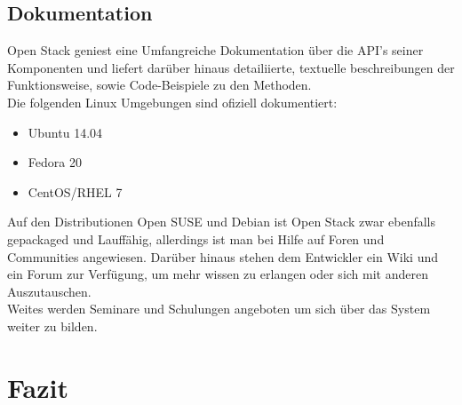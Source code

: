 \documentclass[a4paper,nochapterprefix,ngerman,12pt]{scrreprt}
\begin{document}
\section{Dokumentation}
Open Stack geniest eine Umfangreiche Dokumentation über die API's seiner Komponenten und liefert darüber hinaus detailiierte, textuelle beschreibungen der Funktionsweise, sowie Code-Beispiele zu den Methoden.\\
Die folgenden Linux Umgebungen sind ofiziell dokumentiert:
\begin{itemize}
	\item Ubuntu 14.04
	\item Fedora 20
	\item CentOS/RHEL 7
\end{itemize}
Auf den Distributionen Open SUSE und Debian ist Open Stack zwar ebenfalls gepackaged und Lauffähig, allerdings ist man bei Hilfe auf Foren und Communities angewiesen.
Darüber hinaus stehen dem Entwickler ein Wiki und ein Forum zur Verfügung, um mehr wissen zu erlangen oder sich mit anderen Auszutauschen.\\
Weites werden Seminare und Schulungen angeboten um sich über das System weiter zu bilden.

\chapter{Fazit} \thispagestyle{fancy}

 \thispagestyle{fancy}
 \thispagestyle{fancy}

\listoffigures \thispagestyle{fancy}

\printglossary[style=tree,title={Glossar}]  \thispagestyle{fancy}

\label{lastpage}
\end{document}
